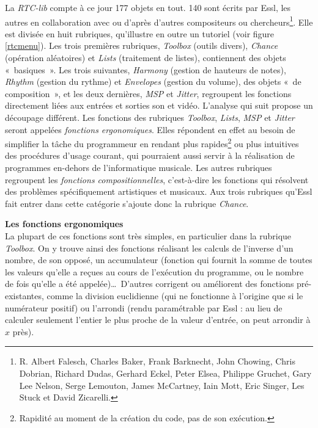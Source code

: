 \documentclass[a4paper,12pt]{article}
\newcommand{\guill}[1]{«~#1~»}
\begin{document}
La \emph{RTC-lib} compte à ce jour 177 objets en tout. 140 sont écrits par Essl, les autres en collaboration avec ou d'après d'autres compositeurs ou chercheurs\footnote{R. Albert Falesch, Charles Baker, Frank Barknecht, John Chowing, Chris Dobrian, Richard Dudas, Gerhard Eckel, Peter Elsea, Philippe Gruchet, Gary Lee Nelson, Serge Lemouton, James McCartney, Iain Mott, Eric Singer, Les Stuck et David Zicarelli.}. Elle est divisée en huit rubriques, qu'illustre en outre un tutoriel (voir figure \ref{rtcmenu}). Les trois premières rubriques, \emph{Toolbox} (outils divers), \emph{Chance} (opération aléatoires) et \emph{Lists} (traitement de listes), contiennent des objets \guill{basiques}. Les trois suivantes, \emph{Harmony} (gestion de hauteurs de notes), \emph{Rhythm} (gestion du rythme) et \emph{Envelopes} (gestion du volume), des objets \guill{de composition}, et les deux dernières, \emph{MSP} et \emph{Jitter}, regroupent les fonctions directement liées aux entrées et sorties son et vidéo. L'analyse qui suit propose un découpage différent. Les fonctions des rubriques \emph{Toolbox}, \emph{Lists}, \emph{MSP} et \emph{Jitter} seront appelées \emph{fonctions ergonomiques}. Elles répondent en effet au besoin de simplifier la tâche du programmeur en rendant plus rapides\footnote{Rapidité au moment de la création du code, pas de son exécution.} ou plus intuitives des procédures d'usage courant, qui pourraient aussi servir à la réalisation de programmes en-dehors de l'informatique musicale. Les autres rubriques regroupent les \emph{fonctions compositionnelles}, c'est-à-dire les fonctions qui résolvent des problèmes spécifiquement artistiques et musicaux. Aux trois rubriques qu'Essl fait entrer dans cette catégorie s'ajoute donc la rubrique \emph{Chance}.

\textbf{Les fonctions ergonomiques} \\
La plupart de ces fonctions sont très simples, en particulier dans la rubrique \emph{Toolbox}. On y trouve ainsi des fonctions réalisant les calculs de l'inverse d'un nombre, de son opposé, un accumulateur (fonction qui fournit la somme de toutes les valeurs qu'elle a reçues au cours de l'exécution du programme, ou le nombre de fois qu'elle a été appelée)\dots~D'autres corrigent ou améliorent des fonctions pré-existantes, comme la division euclidienne (qui ne fonctionne à l'origine que si le numérateur positif) ou l'arrondi (rendu paramétrable par Essl : au lieu de calculer seulement l'entier le plus proche de la valeur d'entrée, on peut arrondir à $x$ près).
\end{document}
